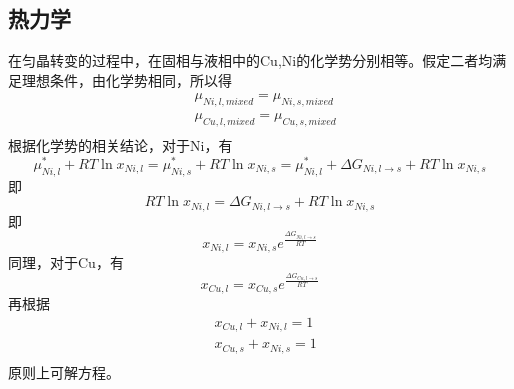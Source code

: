 \subsection{热力学}
在匀晶转变的过程中，在固相与液相中的Cu,Ni的化学势分别相等。假定二者均满足理想条件，由化学势相同，所以得
\begin{align}
&\mu_{Ni,l,mixed}=\mu_{Ni,s,mixed}\\
&\mu_{Cu,l,mixed}=\mu_{Cu,s,mixed}\\
\end{align}
根据化学势的相关结论，对于Ni，有
$$
\mu_{Ni,l}^*+RT \ln x_{Ni,l}=\mu_{Ni,s}^*+RT \ln x_{Ni,s}=\mu_{Ni,l}^*+\Delta G_{Ni, l\rightarrow s} + RT \ln x_{Ni,s}
$$
即
$$
RT \ln x_{Ni,l}=\Delta G_{Ni, l\rightarrow s} + RT \ln x_{Ni,s}
$$
即
\begin{equation}
x_{Ni,l}=x_{Ni,s}e^{\frac{\Delta G_{Ni, l\rightarrow s}}{RT}}
\end{equation}
同理，对于Cu，有
\begin{equation}
x_{Cu,l}=x_{Cu,s}e^{\frac{\Delta G_{Cu, l\rightarrow s}}{RT}}
\end{equation}
再根据
\begin{align}
&x_{Cu,l}+x_{Ni,l}=1\\
&x_{Cu,s}+x_{Ni,s}=1\\
\end{align}
原则上可解方程。

